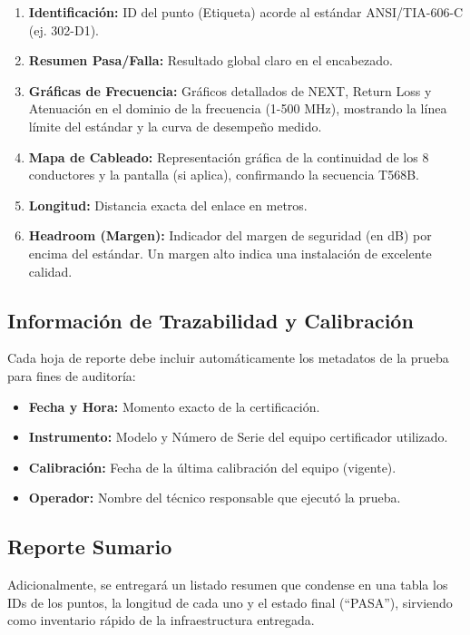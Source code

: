 \begin{enumerate}
    \item \textbf{Identificación:} ID del punto (Etiqueta) acorde al estándar ANSI/TIA-606-C (ej. 302-D1).
    \item \textbf{Resumen Pasa/Falla:} Resultado global claro en el encabezado.
    \item \textbf{Gráficas de Frecuencia:} Gráficos detallados de NEXT, Return Loss y Atenuación en el dominio de la frecuencia (1-500 MHz), mostrando la línea límite del estándar y la curva de desempeño medido.
    \item \textbf{Mapa de Cableado:} Representación gráfica de la continuidad de los 8 conductores y la pantalla (si aplica), confirmando la secuencia T568B.
    \item \textbf{Longitud:} Distancia exacta del enlace en metros.
    \item \textbf{Headroom (Margen):} Indicador del margen de seguridad (en dB) por encima del estándar. Un margen alto indica una instalación de excelente calidad.
\end{enumerate}

\subsection*{Información de Trazabilidad y Calibración}

Cada hoja de reporte debe incluir automáticamente los metadatos de la prueba para fines de auditoría:

\begin{itemize}
    \item \textbf{Fecha y Hora:} Momento exacto de la certificación.
    \item \textbf{Instrumento:} Modelo y Número de Serie del equipo certificador utilizado.
    \item \textbf{Calibración:} Fecha de la última calibración del equipo (vigente).
    \item \textbf{Operador:} Nombre del técnico responsable que ejecutó la prueba.
\end{itemize}

\subsection*{Reporte Sumario}

Adicionalmente, se entregará un listado resumen que condense en una tabla los \textbf{\totalPuntos{}} IDs de los puntos, la longitud de cada uno y el estado final (``PASA''), sirviendo como inventario rápido de la infraestructura entregada.

